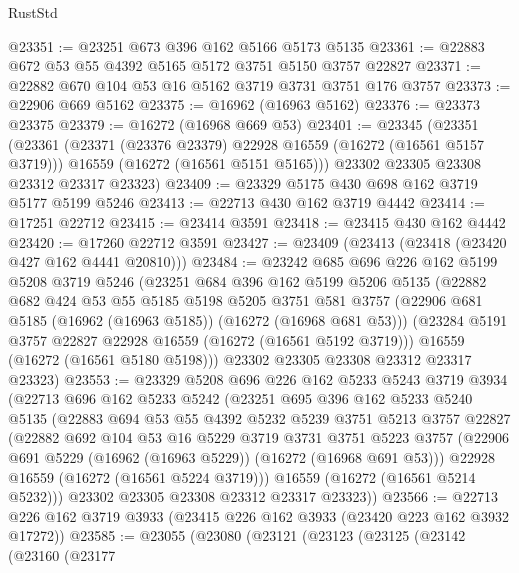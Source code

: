 \begin{lexlean}{RustStd}
\begin{coremodule}
@23351 := @23251 @673 @396 @162 @5166 @5173 @5135
@23361 := @22883 @672 @53 @55 @4392 @5165 @5172 @3751 @5150 @3757 @22827
@23371 := @22882 @670 @104 @53 @16 @5162 @3719 @3731 @3751 @176 @3757
@23373 := @22906 @669 @5162
@23375 := @16962 (@16963 @5162)
@23376 := @23373 @23375
@23379 := @16272 (@16968 @669 @53)
@23401 := @23345
    (@23351
      (@23361
        (@23371 (@23376 @23379) @22928 @16559 (@16272 (@16561 @5157 @3719)))
        @16559
        (@16272 (@16561 @5151 @5165)))
      @23302
      @23305
      @23308
      @23312
      @23317
      @23323)
@23409 := @23329 @5175 @430 @698 @162 @3719 @5177 @5199 @5246
@23413 := @22713 @430 @162 @3719 @4442
@23414 := @17251 @22712
@23415 := @23414 @3591
@23418 := @23415 @430 @162 @4442
@23420 := @17260 @22712 @3591
@23427 := @23409 (@23413 (@23418 (@23420 @427 @162 @4441 @20810)))
@23484 := @23242
    @685
    @696
    @226
    @162
    @5199
    @5208
    @3719
    @5246
    (@23251
      @684
      @396
      @162
      @5199
      @5206
      @5135
      (@22882
        @682
        @424
        @53
        @55
        @5185
        @5198
        @5205
        @3751
        @581
        @3757
        (@22906 @681 @5185 (@16962 (@16963 @5185)) (@16272 (@16968 @681 @53)))
        (@23284 @5191 @3757 @22827 @22928 @16559 (@16272 (@16561 @5192 @3719)))
        @16559
        (@16272 (@16561 @5180 @5198)))
      @23302
      @23305
      @23308
      @23312
      @23317
      @23323)
@23553 := @23329
    @5208
    @696
    @226
    @162
    @5233
    @5243
    @3719
    @3934
    (@22713
      @696
      @162
      @5233
      @5242
      (@23251
        @695
        @396
        @162
        @5233
        @5240
        @5135
        (@22883
          @694
          @53
          @55
          @4392
          @5232
          @5239
          @3751
          @5213
          @3757
          @22827
          (@22882
            @692
            @104
            @53
            @16
            @5229
            @3719
            @3731
            @3751
            @5223
            @3757
            (@22906 @691 @5229 (@16962 (@16963 @5229)) (@16272 (@16968 @691 @53)))
            @22928
            @16559
            (@16272 (@16561 @5224 @3719)))
          @16559
          (@16272 (@16561 @5214 @5232)))
        @23302
        @23305
        @23308
        @23312
        @23317
        @23323))
@23566 := @22713 @226 @162 @3719 @3933 (@23415 @226 @162 @3933 (@23420 @223 @162 @3932 @17272))
@23585 := @23055
    (@23080
      (@23121
        (@23123
          (@23125
            (@23142
              (@23160
                (@23177

\end{coremodule}
\end{lexlean}
